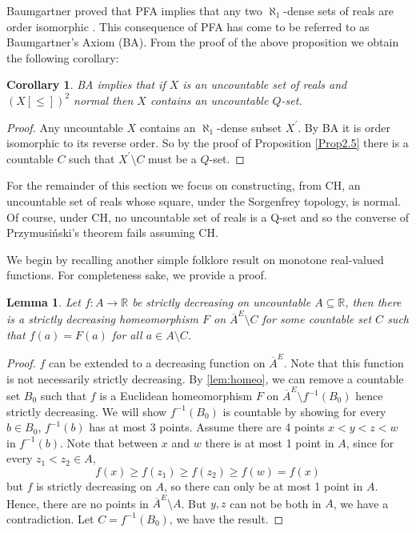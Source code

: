 \documentclass[11pt]{amsart}
\newtheorem{cor}[theorem]{Corollary}
\newtheorem{lemma}[theorem]{Lemma}
\theoremstyle{definition}
\theoremstyle{remark}
\newcommand{\R}{\mathbb{R}}
\theoremstyle{plain}
\begin{document}
Baumgartner proved that PFA implies that any two $\aleph_1$-dense sets of reals are order isomorphic \cite{Baumgartner1973}. This consequence of PFA has come to be referred to as Baumgartner's Axiom (BA). From the proof of the above proposition we obtain the following corollary:
\begin{cor}\label{BA}
    BA implies that if $X$ is an uncountable set of reals and $(X[\leq])^2$ normal then $X$ contains an uncountable $Q$-set. 
\end{cor}
\begin{proof} Any uncountable $X$ contains an $\aleph_1$-dense subset $X^\prime$. By BA it is order isomorphic to its reverse order. So by the proof of Proposition \ref{Prop2.5} there is a countable $C$ such that $X^\prime\setminus C$ must be a $Q$-set.\end{proof}

For the remainder of this section we focus on constructing, from CH, an uncountable set of reals whose square, under the Sorgenfrey topology, is normal. Of course, under CH, no uncountable set of reals is a Q-set and so the converse of Przymusi\'nski's theorem fails assuming CH. 

We begin by recalling another simple folklore result on monotone real-valued functions. For completeness sake, we provide a proof. 

\begin{lemma}\label{lem:extend}
    Let $f:A\to \R$ be strictly decreasing on uncountable $A\subseteq \R$, then there is a strictly decreasing homeomorphism $F$ on $\overline{A}^E \setminus C$ for some countable set $C$ such that $f(a)=F(a)$ for all $a\in A\setminus C$.
\end{lemma}
\begin{proof}
    $f$ can be extended to a decreasing function on $\overline{A}^E$. Note that this function is not necessarily strictly decreasing. By \ref{lem:homeo}, we can remove a countable set $B_0$ such that  $f$ is a Euclidean homeomorphism $F$ on $\overline{A}^E\setminus f^{-1}(B_0)$ hence strictly decreasing. We will show $f^{-1}(B_0)$ is countable by showing for every $b\in B_0$, $f^{-1}(b)$ has at most 3 points. Assume there are 4 points $x<y<z<w$ in $f^{-1}(b)$. Note that between $x$ and $w$ there is at most 1 point in $A$, since for every $z_1<z_2\in A$,
    \[f(x)\geq f(z_1)\geq f(z_2)\geq f(w)=f(x)\]
    but $f$ is strictly decreasing on $A$, so there can only be at most 1 point in $A$. Hence, there are no points in $\overline{A}^E\setminus A$. But $y,z$ can not be both in $A$, we have a contradiction. Let $C=f^{-1}(B_0)$, we have the result.
\end{proof}
\end{document}
